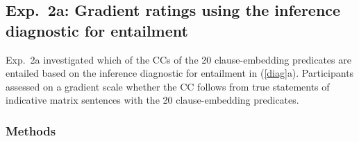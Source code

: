 \documentclass[11pt,fleqn]{article}
\newcommand{\jd}[1]{\textbf{\textcolor{Pink}{[jd: #1]}}}
\newcommand{\6}{\mbox{$[\hspace*{-.6mm}[$}}
\newcommand{\9}{\mbox{$]\hspace*{-.6mm}]$}}
\begin{document}
\subsection{Exp.~2a: Gradient ratings using the inference diagnostic for entailment}\label{s31}

Exp.~2a investigated which of the CCs of the 20 clause-embedding predicates are entailed based on the inference diagnostic for entailment in (\ref{diag}a). Participants assessed on a gradient scale whether the CC follows from true statements of indicative matrix sentences with the 20 clause-embedding predicates.


%

\subsubsection{Methods}
\end{document}
